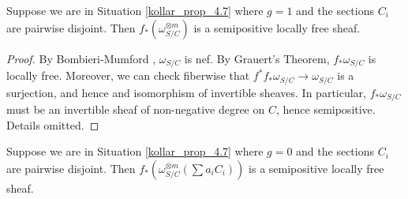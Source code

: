 \begin{lemma}\label{base_case_genus_1}
Suppose we are in Situation \ref{kollar_prop_4.7} where $g=1$ and the sections $C_i$ are pairwise disjoint.
Then $f_{*}(\omega_{S/C}^{\otimes m})$ is a semipositive locally free sheaf.
\end{lemma}
\begin{proof}
By Bombieri-Mumford , $\omega_{S/C}$ is nef.
By Grauert's Theorem, $f_{*}\omega_{S/C}$ is locally free.
Moreover, we can check fiberwise that $f^{*}f_{*}\omega_{S/C}\to\omega_{S/C}$ is a surjection, and hence and isomorphism of invertible sheaves.
In particular, $f_{*}\omega_{S/C}$ must be an invertible sheaf of non-negative degree on $C$, hence semipositive.
Details omitted.
\end{proof}

\begin{lemma}\label{inductive_step_genus_0}
Suppose we are in Situation \ref{kollar_prop_4.7} where $g=0$ and the sections $C_i$ are pairwise disjoint.
Then $f_{*}(\omega_{S/C}^{\otimes m}(\sum a_iC_i))$ is a semipositive locally free sheaf.
\end{lemma}
